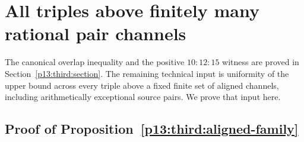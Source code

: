 \section{All triples above finitely many rational pair channels}
\label{p14:comp:third}

The canonical overlap inequality and the positive $10:12:15$ witness
are proved in Section~\ref{p13:third:section}.  The remaining technical
input is uniformity of the upper bound across every triple above a
fixed finite set of aligned channels, including arithmetically
exceptional source pairs.  We prove that input here.

\subsection{Proof of Proposition~\ref{p13:third:aligned-family}}
\label{p14:comp:third:aligned-family}

